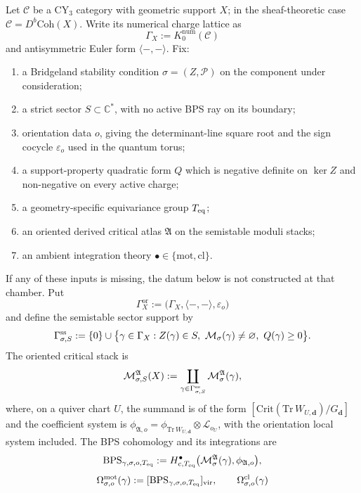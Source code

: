 \begin{definition}
\label{def:universal-positive-geometry-grammar}
Let $\mathcal{C}$ be a CY$_3$ category with geometric support $X$; in
the sheaf-theoretic case $\mathcal{C}=D^b\mathrm{Coh}(X)$. Write its
numerical charge lattice as
\[
 \Gamma_X := K^{\mathrm{num}}_0(\mathcal{C})
\]
and antisymmetric Euler form $\langle-,-\rangle$. Fix:
\begin{enumerate}[label=\textup{(\alph*)}]
\item a Bridgeland stability condition $\sigma=(Z,\mathcal{P})$ on the
component under consideration;
\item a strict sector $S\subset\mathbb{C}^*$, with no active BPS ray on
its boundary;
\item orientation data $o$, giving the determinant-line square root and
the sign cocycle $\varepsilon_o$ used in the quantum torus;
\item a support-property quadratic form $Q$ which is negative definite
on $\ker Z$ and non-negative on every active charge;
\item a geometry-specific equivariance group $T_{\mathrm{eq}}$;
\item an oriented derived critical atlas $\mathfrak A$ on the
semistable moduli stacks;
\item an ambient integration theory
$\bullet\in\{\mathrm{mot},\mathrm{cl}\}$.
\end{enumerate}
If any of these inputs is missing, the datum below is not constructed at
that chamber. Put
\[
 \Gamma_X^{\mathrm{or}}
 :=
 \bigl(\Gamma_X,\langle-,-\rangle,\varepsilon_o\bigr)
\]
and define the semistable sector support by
\[
 \Gamma^{\mathrm{ss}}_{\sigma,S}
 :=
 \{0\}\cup
 \bigl\{\gamma\in\Gamma_X:
 Z(\gamma)\in S,\
 \mathcal M_\sigma(\gamma)\neq\varnothing,\
 Q(\gamma)\geq0
 \bigr\}.
\]
The oriented critical stack is
\[
 \mathcal{M}^{\mathfrak A}_{\sigma,S}(X)
 :=
 \coprod_{\gamma\in\Gamma^{\mathrm{ss}}_{\sigma,S}}
 \mathcal M^{\mathfrak A}_\sigma(\gamma),
\]
where, on a quiver chart $U$, the summand is of the form
$[\mathrm{Crit}(\mathrm{Tr}\,W_{U,\mathbf d})/G_{\mathbf d}]$ and the
coefficient system is
$\phi_{\mathfrak A,o}=\phi_{\mathrm{Tr}\,W_{U,\mathbf d}}\otimes
\mathscr L_{o_U}$, with the orientation local system included.
The BPS cohomology and its integrations are
\[
 \operatorname{BPS}_{\gamma,\sigma,o,T_{\mathrm{eq}}}
 :=
 H^\bullet_{c,T_{\mathrm{eq}}}
 \bigl(\mathcal M^{\mathfrak A}_\sigma(\gamma),
 \phi_{\mathfrak A,o}\bigr),
\]
\[
 \Omega^{\mathrm{mot}}_{\sigma,o}(\gamma)
 :=
 [\operatorname{BPS}_{\gamma,\sigma,o,T_{\mathrm{eq}}}]_{\mathrm{vir}},
 \qquad
 \Omega^{\mathrm{cl}}_{\sigma,o}(\gamma)
\]
\end{definition}
